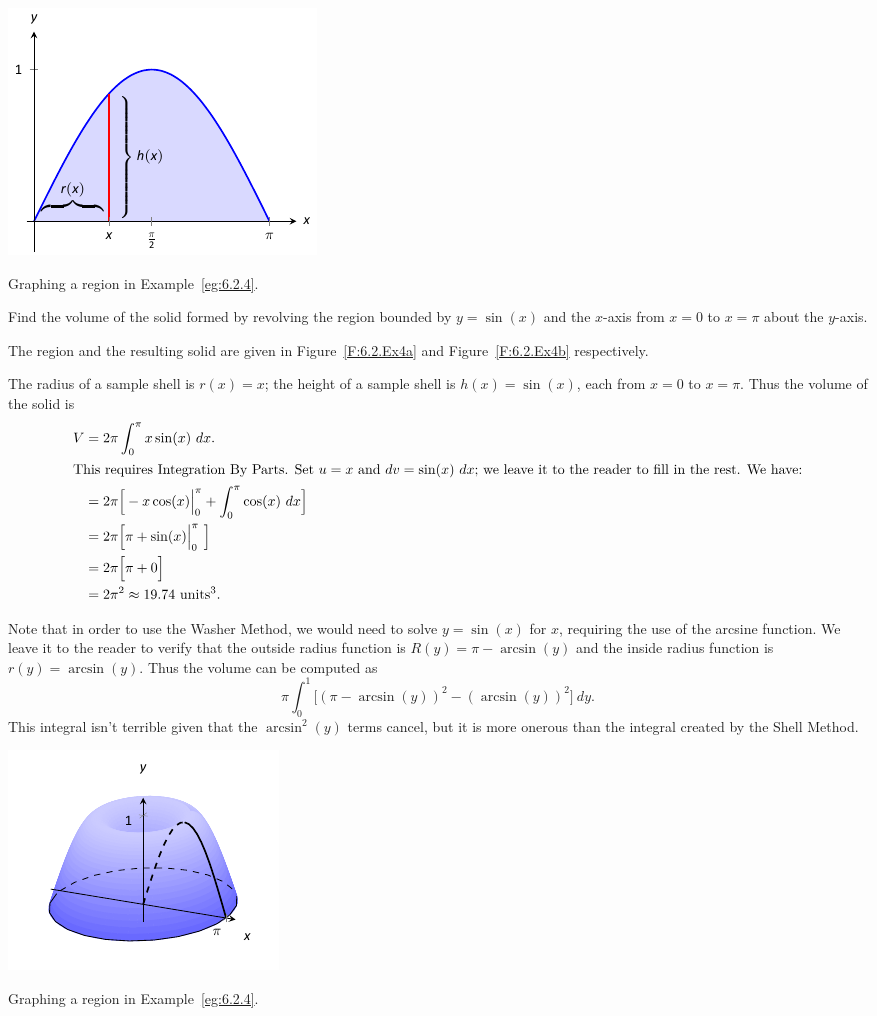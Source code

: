 \begin{marginfigure}[7cm] %
\includegraphics{figures/figshell4a}
\caption{Graphing a region in Example~\ref{eg:6.2.4}.} \label{F:6.2.Ex4a}
\end{marginfigure}

\begin{example} \label{eg:6.2.4} %
Find the volume of the solid formed by revolving the region bounded by $y= \sin(x)$ and the $x$-axis from $x=0$ to $x=\pi$ about the $y$-axis.

\solution
The region and the resulting solid are given in Figure~\ref{F:6.2.Ex4a} and Figure~\ref{F:6.2.Ex4b} respectively.

The radius of a sample shell is $r(x) = x$; the height of a sample shell is $h(x) = \sin(x)$, each from $x=0$ to $x=\pi$. Thus the volume of the solid is 
\begin{align*}
V &=	2\pi\int_0^{\pi} x\sin(x)\ dx. \\
\intertext{This requires Integration By Parts. Set $u=x$ and $dv=\sin(x)\ dx$; we leave it to the reader to fill in the rest. We have:}
	&= 2\pi\Big[-x\cos(x)\Big|_0^{\pi} +\int_0^{\pi}\cos(x)\ dx \Big] \\
	&= 2\pi\Big[\pi + \sin(x) \Big|_0^{\pi}\ \Big] \\
	&= 2\pi\Big[\pi + 0 \Big] \\
	&= 2\pi^2 \approx 19.74 \ \text{units}^3.
	\end{align*}

Note that in order to use the Washer Method, we would need to solve $y=\sin(x)$ for $x$, requiring the use of the arcsine function. We leave it to the reader to verify that the outside radius function is $R(y) = \pi-\arcsin(y)$ and the inside radius function is $r(y)=\arcsin(y)$. Thus the volume can be computed as $$\pi\int_0^1 \Big[ (\pi-\arcsin(y))^2-(\arcsin(y))^2\Big]\ dy.$$	This integral isn't terrible given that the $\arcsin^2(y)$ terms cancel, but it is more onerous than the integral created by the Shell Method.
\end{example}

\begin{marginfigure}[-8cm] %
\includegraphics{figures/figshell4b}
\caption{Graphing a region in Example~\ref{eg:6.2.4}.} \label{F:6.2.Ex4b}
\end{marginfigure}
